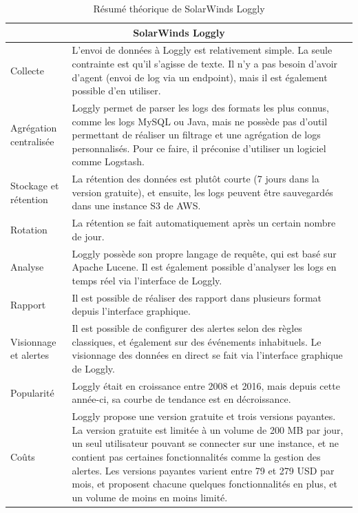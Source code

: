 \documentclass[paper=a4, fontsize=11pt]{scrartcl}
\begin{document}
\begin{table}[H]
\centering
\begin{tabular}{ |p{4cm}||p{13cm}|  }
    \hline
    \multicolumn{2}{|c|}{SolarWinds Loggly} \\
    \hline
    Collecte & L'envoi de données à Loggly est relativement simple. La seule contrainte est qu'il s'agisse de texte. Il n'y a pas besoin d'avoir d'agent (envoi de log via un endpoint), mais il est également possible d'en utiliser.\\
    \hline
    Agrégation centralisée & Loggly permet de parser les logs des formats les plus connus, comme les logs MySQL ou Java, mais ne possède pas d'outil permettant de réaliser un filtrage et une agrégation de logs personnalisés. Pour ce faire, il préconise d'utiliser un logiciel comme Logstash. \\
    \hline
    Stockage et rétention & La rétention des données est plutôt courte (7 jours dans la version gratuite), et ensuite, les logs peuvent être sauvegardés dans une instance S3 de AWS.\\
    \hline
    Rotation & La rétention se fait automatiquement après un certain nombre de jour.\\
    \hline
    Analyse & Loggly possède son propre langage de requête, qui est basé sur Apache Lucene. Il est également possible d'analyser les logs en temps réel via l'interface de Loggly.\\
    \hline
    Rapport & Il est possible de réaliser des rapport dans plusieurs format depuis l'interface graphique.\\
    \hline
    Visionnage et alertes & Il est possible de configurer des alertes selon des règles classiques, et également sur des événements inhabituels. Le visionnage des données en direct se fait via l'interface graphique de Loggly.\\
    \hline
    Popularité & Loggly était en croissance entre 2008 et 2016, mais depuis cette année-ci, sa courbe de tendance est en décroissance.\\
    \hline
    Coûts & Loggly propose une version gratuite et trois versions payantes. La version gratuite est limitée à un volume de 200 MB par jour, un seul utilisateur pouvant se connecter sur une instance, et ne contient pas certaines fonctionnalités comme la gestion des alertes. Les versions payantes varient entre 79 et 279 USD par mois, et proposent chacune quelques fonctionnalités en plus, et un volume de moins en moins limité.\\
    \hline
\end{tabular}
\caption{Résumé théorique de SolarWinds Loggly}
\label{t-resumeLoggly}
\end{table}
\end{document}
